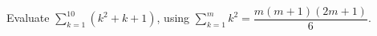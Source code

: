 Evaluate $\displaystyle\sum_{k=1}^{10}\left(k^2+k+1\right)$, using $\displaystyle\sum_{k=1}^{m}k^2=\dfrac{m(m+1)(2m+1)}{6}$.
